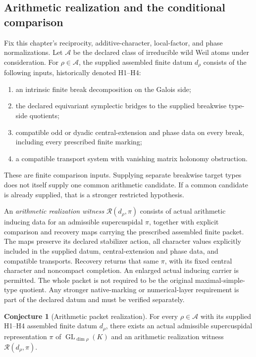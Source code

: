 \documentclass[11pt]{amsart}
\theoremstyle{definition}
\newtheorem{conjecture}[conjecture]{Conjecture}
\theoremstyle{remark}
\newcommand{\GL}{\operatorname{GL}}
\begin{document}
\subsection{Arithmetic realization and the conditional comparison}

Fix this chapter's reciprocity, additive-character, local-factor, and phase
normalizations. Let \(\mathcal A\) be the declared class of irreducible wild
Weil atoms under consideration. For \(\rho\in\mathcal A\), the supplied
assembled finite datum \(d_\rho\) consists of the following inputs,
historically denoted H1--H4:
\begin{enumerate}
\item an intrinsic finite break decomposition on the Galois side;
\item the declared equivariant symplectic bridges to the supplied breakwise
type-side quotients;
\item compatible odd or dyadic central-extension and phase data on every
break, including every prescribed finite marking;
\item a compatible transport system with vanishing matrix holonomy
obstruction.
\end{enumerate}
These are finite comparison inputs. Supplying separate breakwise target
types does not itself supply one common arithmetic candidate. If a common
candidate is already supplied, that is a stronger restricted hypothesis.

An \emph{arithmetic realization witness}
\(\mathcal R(d_\rho,\pi)\) consists of actual arithmetic inducing data
for an admissible supercuspidal \(\pi\), together with explicit
comparison and recovery maps carrying the prescribed assembled finite
packet. The maps preserve its declared stabilizer action, all character values
explicitly included in the supplied datum, central-extension and phase
data, and compatible transports.
Recovery returns that same \(\pi\), with its fixed central character and
noncompact completion. An enlarged actual inducing carrier is permitted.
The whole packet is not required to be the original maximal-simple-type
quotient. Any stronger native-marking or numerical-layer requirement is
part of the declared datum and must be verified separately.

\begingroup
\renewcommand{\theconjecture}{66}
\begin{conjecture}[Arithmetic packet realization]
\label{conj:arithmetic_realization}\label{thm:conditional_atomic}
For every \(\rho\in\mathcal A\) with its supplied H1--H4 assembled
finite datum \(d_\rho\), there exists an actual admissible supercuspidal
representation \(\pi\) of \(\GL_{\dim\rho}(K)\) and an arithmetic
realization witness \(\mathcal R(d_\rho,\pi)\).
\end{conjecture}
\endgroup
\end{document}

